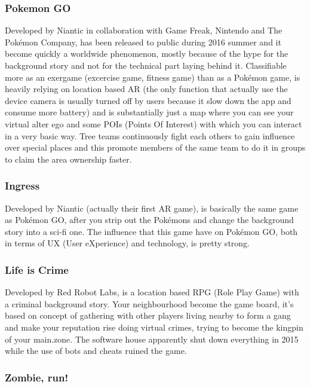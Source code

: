 			\subsubsection{Pokemon GO}
			
				Developed by Niantic in collaboration with Game Freak, Nintendo and The Pokémon Company, has been released to public during 2016 summer and it become quickly a worldwide phenomenon, mostly because of the hype for the background story and not for the technical part laying behind it.
				Classifiable more as an exergame (excercise game, fitness game) than as a Pokémon game, is heavily relying on location based AR (the only function that actually use the device camera is usually turned off by users because it slow down the app and consume more battery) and is substantially just a map where you can see your virtual alter ego and some POIs (Points Of Interest) with which you can interact in a very basic way.
				Tree teams continuously fight each others to gain influence over special places and this promote members of the same team to do it in groups to claim the area ownership faster.
			
			\subsubsection{Ingress}
			
				Developed by Niantic (actually their first AR game), is basically the same game as Pokémon GO, after you strip out the Pokémons and change the background story into a sci-fi one.
				The influence that this game have on Pokémon GO, both in terms of UX (User eXperience) and technology, is pretty strong.
			
			\subsubsection{Life is Crime}
			
				Developed by Red Robot Labs, is a location based RPG (Role Play Game) with a criminal background story. Your neighbourhood become the game board, it's based on concept of gathering with other players living nearby to form a gang and make your reputation rise doing virtual crimes, trying to become the kingpin of your main.zone.
				The software house apparently shut down everything in 2015 while the use of bots and cheats ruined the game.
			
			\subsubsection{Zombie, run!}
			
